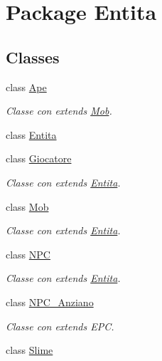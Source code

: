 \hypertarget{namespace_entita}{}\section{Package Entita}
\label{namespace_entita}
\subsection*{Classes}
\begin{DoxyCompactItemize}
\item 
class \hyperlink{class_entita_1_1_ape}{Ape}
\begin{DoxyCompactList}\small\item\em Classe con extends \hyperlink{class_entita_1_1_mob}{Mob}. \end{DoxyCompactList}\item 
class \hyperlink{class_entita_1_1_entita}{Entita}
\item 
class \hyperlink{class_entita_1_1_giocatore}{Giocatore}
\begin{DoxyCompactList}\small\item\em Classe con extends \hyperlink{class_entita_1_1_entita}{Entita}. \end{DoxyCompactList}\item 
class \hyperlink{class_entita_1_1_mob}{Mob}
\begin{DoxyCompactList}\small\item\em Classe con extends \hyperlink{class_entita_1_1_entita}{Entita}. \end{DoxyCompactList}\item 
class \hyperlink{class_entita_1_1_n_p_c}{N\+PC}
\begin{DoxyCompactList}\small\item\em Classe con extends \hyperlink{class_entita_1_1_entita}{Entita}. \end{DoxyCompactList}\item 
class \hyperlink{class_entita_1_1_n_p_c___anziano}{N\+P\+C\+\_\+\+Anziano}
\begin{DoxyCompactList}\small\item\em Classe con extends E\+PC. \end{DoxyCompactList}\item 
class \hyperlink{class_entita_1_1_slime}{Slime}
\end{DoxyCompactItemize}
